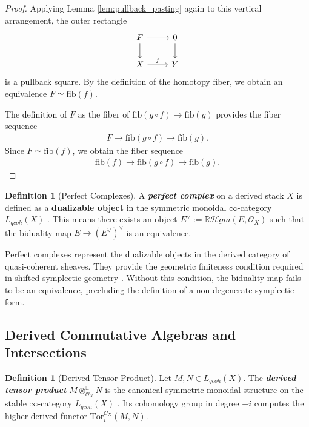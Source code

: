 \documentclass[reqno]{amsart}
\theoremstyle{definition}
\newtheorem{definition}[theorem]{Definition}
\theoremstyle{remark}
\newcommand{\cO}{\mathcal{O}}
\newcommand{\bfem}[1]{\textbf{\textit{#1}}}
\begin{document}
\begin{proof}
  Applying Lemma \ref{lem:pullback_pasting} again to this vertical arrangement, the outer rectangle
  \begin{align*}
    \begin{tikzcd}[ampersand replacement=\&]
      F \arrow[r] \arrow[d] \& 0 \arrow[d] \\
      X \arrow[r, "f"] \& Y
    \end{tikzcd}
  \end{align*}
  is a pullback square. By the definition of the homotopy fiber, we obtain an equivalence $F \simeq \mathrm{fib}(f)$.

  The definition of $F$ as the fiber of $\mathrm{fib}(g \circ f) \to \mathrm{fib}(g)$ provides the fiber sequence
  \begin{align*}
    F \to \mathrm{fib}(g \circ f) \to \mathrm{fib}(g).
  \end{align*}
  Since $F \simeq \mathrm{fib}(f)$, we obtain the fiber sequence
  \begin{align*}
    \mathrm{fib}(f) \to \mathrm{fib}(g \circ f) \to \mathrm{fib}(g).
  \end{align*}
\end{proof}

\begin{definition}[Perfect Complexes]
  A \bfem{perfect complex} on a derived stack $X$ is
  defined as a \textbf{dualizable object} in the symmetric monoidal
  $\infty$-category $L_{qcoh}(X)$ \cite[Section 1.1]{PTVV}. This
  means there exists an object $E^\vee :=
  \mathbb{R}\underline{\mathcal{H}om}(E, \mathcal{O}_X)$ such that
  the biduality map $E \to (E^\vee)^\vee$ is an equivalence.
\end{definition}

Perfect complexes represent the dualizable objects in the derived
category of quasi-coherent sheaves. They provide the geometric
finiteness condition required in shifted symplectic geometry
\cite[Section 1.1]{Calaque}. Without this
condition, the biduality map fails to be an equivalence, precluding the
definition of a non-degenerate symplectic form.

\subsection{Derived Commutative Algebras and Intersections} \label{sec:derived_comm}

\begin{definition}[Derived Tensor Product]
  Let $M, N \in L_{qcoh}(X)$. The \bfem{derived tensor product} $M
  \otimes^{\mathbb{L}}_{\cO_X} N$
  is the canonical symmetric monoidal structure on the stable
  $\infty$-category $L_{qcoh}(X)$ \cite[Section 4.4.2]{LurieHA}.
  Its cohomology group in degree $-i$ computes the higher derived functor
  $\mathrm{Tor}_i^{\cO_X}(M, N)$.
\end{definition}
\end{document}
